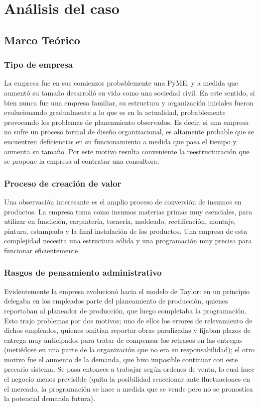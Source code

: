 \documentclass[12pt,a4paper,spanish]{article}
\begin{document}
\newpage
\section{An\'{a}lisis del caso}

\subsection{Marco Te\'orico}

\subsubsection{Tipo de empresa}
La empresa fue en sus comienzos probablemente una PyME, y a medida que aument\'o su tama\~no desarroll\'o su vida como una sociedad civil. En este sentido, si bien nunca fue una empresa familiar, su estructura y organizaci\'on iniciales fueron evolucionando gradualmente a lo que es en la actualidad, probablemente provocando los problemas de planeamiento observados. Es decir, si una empresa no sufre un proceso formal de dise\~no organizacional, es altamente probable que se encuentren deficiencias en su funcionamiento a medida que pasa el tiempo y aumenta su tama\~no. Por este motivo resulta conveniente la reestructuraci\'on que se propone la empresa al contratar una consultora.

\subsubsection{Proceso de creaci\'on de valor}
Una observaci\'on interesante es el amplio proceso de conversi\'on de insumos en productos. La empresa toma como insumos materias primas muy esenciales, para utilizar en fundici\'on, carpinter\'ia, torner\'ia, moldeado, rectificaci\'on, montaje, pintura, estampado y la final instalaci\'on de los productos. Una empresa de esta complejidad necesita una estructura s\'olida y una programaci\'on muy precisa para funcionar eficientemente.

\subsubsection{Rasgos de pensamiento administrativo}
Evidentemente la empresa evolucion\'o hacia el modelo de Taylor: en un principio delegaba en los empleados parte del planeamiento de producci\'on, quienes reportaban al planeador de producci\'on, que luego completaba la programaci\'on. Esto trajo problemas por dos motivos; uno de ellos los errores de relevamiento de dichos empleados, quienes omit\'ian reportar obras paralizadas y fijaban plazos de entrega muy anticipados para tratar de compensar los retrasos en las entregas (meti\'edose en una parte de la organizaci\'on que no era su responsabilidad); el otro motivo fue el aumento de la demanda, que hizo imposible continuar con este precario sistema. Se pasa entonces a trabajar seg\'{u}n ordenes de venta, lo cual hace el negocio menos previsible (quita la posibilidad reaccionar ante fluctuaciones en el mercado, la programaci\'on se hace a medida que se vende pero no se pronostica la potencial demanda futura).
\end{document}
